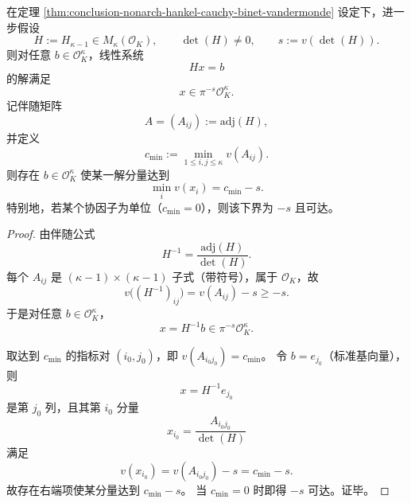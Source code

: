 \begin{corollary}\label{cor:conclusion-nonarch-prony-precision-loss}
在定理 \ref{thm:conclusion-nonarch-hankel-cauchy-binet-vandermonde} 设定下，进一步假设
\[
H:=H_{\kappa-1}\in M_\kappa(\mathcal O_K),\qquad
\det(H)\neq 0,\qquad
s:=v(\det(H)).
\]
则对任意 \(b\in\mathcal O_K^\kappa\)，线性系统
\[
Hx=b
\]
的解满足
\[
x\in \pi^{-s}\mathcal O_K^\kappa.
\]
记伴随矩阵
\[
A=(A_{ij}):=\mathrm{adj}(H),
\]
并定义
\[
c_{\min}:=\min_{1\le i,j\le \kappa}v(A_{ij}).
\]
则存在 \(b\in\mathcal O_K^\kappa\) 使某一解分量达到
\[
\min_i v(x_i)=c_{\min}-s.
\]
特别地，若某个协因子为单位（\(c_{\min}=0\)），则该下界为 \(-s\) 且可达。
\end{corollary}
\begin{proof}
由伴随公式
\[
H^{-1}=\frac{\mathrm{adj}(H)}{\det(H)}.
\]
每个 \(A_{ij}\) 是 \((\kappa-1)\times(\kappa-1)\) 子式（带符号），属于 \(\mathcal O_K\)，故
\[
v\!\bigl((H^{-1})_{ij}\bigr)=v(A_{ij})-s\ge -s.
\]
于是对任意 \(b\in\mathcal O_K^\kappa\)，
\[
x=H^{-1}b\in \pi^{-s}\mathcal O_K^\kappa.
\]

取达到 \(c_{\min}\) 的指标对 \((i_0,j_0)\)，即 \(v(A_{i_0j_0})=c_{\min}\)。
令 \(b=e_{j_0}\)（标准基向量），则
\[
x=H^{-1}e_{j_0}
\]
是第 \(j_0\) 列，且其第 \(i_0\) 分量
\[
x_{i_0}=\frac{A_{i_0j_0}}{\det(H)}
\]
满足
\[
v(x_{i_0})=v(A_{i_0j_0})-s=c_{\min}-s.
\]
故存在右端项使某分量达到 \(c_{\min}-s\)。
当 \(c_{\min}=0\) 时即得 \(-s\) 可达。证毕。
\end{proof}

